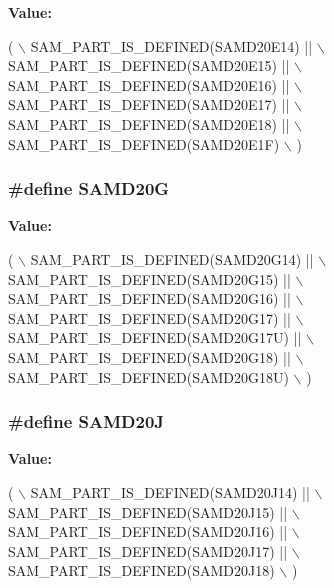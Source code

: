 {\bfseries Value\-:}
\begin{DoxyCode}
( \(\backslash\)
                SAM\_PART\_IS\_DEFINED(SAMD20E14) || \(\backslash\)
                SAM\_PART\_IS\_DEFINED(SAMD20E15) || \(\backslash\)
                SAM\_PART\_IS\_DEFINED(SAMD20E16) || \(\backslash\)
                SAM\_PART\_IS\_DEFINED(SAMD20E17) || \(\backslash\)
                SAM\_PART\_IS\_DEFINED(SAMD20E18) || \(\backslash\)
                SAM\_PART\_IS\_DEFINED(SAMD20E1F) \(\backslash\)
        )
\end{DoxyCode}
\hypertarget{group__sam__part__macros__group_ga98be0064016617a8ce1449905046f81a}{
\subsubsection[{S\-A\-M\-D20\-G}]{\setlength{\rightskip}{0pt plus 5cm}\#define S\-A\-M\-D20\-G}}\label{group__sam__part__macros__group_ga98be0064016617a8ce1449905046f81a}
{\bfseries Value\-:}
\begin{DoxyCode}
( \(\backslash\)
                SAM\_PART\_IS\_DEFINED(SAMD20G14)  || \(\backslash\)
                SAM\_PART\_IS\_DEFINED(SAMD20G15)  || \(\backslash\)
                SAM\_PART\_IS\_DEFINED(SAMD20G16)  || \(\backslash\)
                SAM\_PART\_IS\_DEFINED(SAMD20G17)  || \(\backslash\)
                SAM\_PART\_IS\_DEFINED(SAMD20G17U) || \(\backslash\)
                SAM\_PART\_IS\_DEFINED(SAMD20G18)  || \(\backslash\)
                SAM\_PART\_IS\_DEFINED(SAMD20G18U) \(\backslash\)
        )
\end{DoxyCode}
\hypertarget{group__sam__part__macros__group_ga5f1a6d04b67f9e1eceb737aea3ece8c8}{
\subsubsection[{S\-A\-M\-D20\-J}]{\setlength{\rightskip}{0pt plus 5cm}\#define S\-A\-M\-D20\-J}}\label{group__sam__part__macros__group_ga5f1a6d04b67f9e1eceb737aea3ece8c8}
{\bfseries Value\-:}
\begin{DoxyCode}
( \(\backslash\)
                SAM\_PART\_IS\_DEFINED(SAMD20J14) || \(\backslash\)
                SAM\_PART\_IS\_DEFINED(SAMD20J15) || \(\backslash\)
                SAM\_PART\_IS\_DEFINED(SAMD20J16) || \(\backslash\)
                SAM\_PART\_IS\_DEFINED(SAMD20J17) || \(\backslash\)
                SAM\_PART\_IS\_DEFINED(SAMD20J18) \(\backslash\)
        )
\end{DoxyCode}

